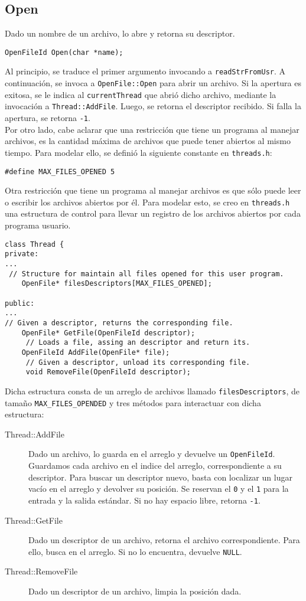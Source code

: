 \subsection*{Open}
Dado un nombre de un archivo, lo abre y retorna su descriptor.
\begin{lstlisting}[style=C]
OpenFileId Open(char *name);
\end{lstlisting}
Al principio, se traduce el primer argumento invocando a \texttt{readStrFromUsr}. A continuación, se invoca a \texttt{OpenFile::Open} para abrir un archivo. Si la apertura es exitosa, se le indica al \texttt{currentThread} que abrió dicho archivo, mediante la invocación a \texttt{Thread::AddFile}. Luego, se retorna el descriptor recibido. Si falla la apertura, se retorna \texttt{-1}.\\
Por otro lado, cabe aclarar que una restricción que tiene un programa al manejar archivos, es la cantidad máxima de archivos que puede tener abiertos al mismo tiempo. Para modelar ello, se definió la siguiente constante en \texttt{threads.h}:
\begin{lstlisting}[style=C]
#define MAX_FILES_OPENED 5
\end{lstlisting}
Otra restricción que tiene un programa al manejar archivos es que sólo puede leer o escribir los archivos abiertos por él. Para modelar esto, se creo en \texttt{threads.h} una estructura de control para llevar un registro de los archivos abiertos por cada programa usuario.
\begin{lstlisting}[style=C]
class Thread {
private:
...
 // Structure for maintain all files opened for this user program.
    OpenFile* filesDescriptors[MAX_FILES_OPENED];
    
public:
...
// Given a descriptor, returns the corresponding file.
    OpenFile* GetFile(OpenFileId descriptor); 
     // Loads a file, assing an descriptor and return its.
    OpenFileId AddFile(OpenFile* file);
     // Given a descriptor, unload its corresponding file.
     void RemoveFile(OpenFileId descriptor);
\end{lstlisting}
Dicha estructura consta de un arreglo de archivos llamado \texttt{filesDescriptors}, de tamaño \texttt{MAX\_FILES\_OPENDED} y tres métodos para interactuar con dicha estructura:
\begin{description}
    \item[Thread::AddFile] Dado un archivo, lo guarda en el arreglo y devuelve un \texttt{OpenFileId}. Guardamos cada archivo en el indice del arreglo, correspondiente a su descriptor. Para buscar un descriptor nuevo, basta con localizar un lugar vacío en el arreglo y devolver su posición. Se reservan el \texttt{0} y el \texttt{1} para la entrada y la salida estándar. Si no hay espacio libre, retorna \texttt{-1}.
    \item[Thread::GetFile] Dado un descriptor de un archivo, retorna el archivo correspondiente. Para ello, busca en el arreglo. Si no lo encuentra, devuelve \texttt{NULL}.
    \item[Thread::RemoveFile] Dado un descriptor de un archivo, limpia la posición dada.
\end{description}

